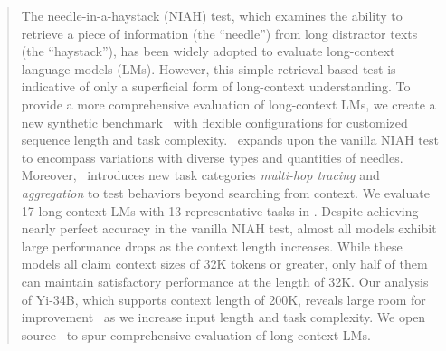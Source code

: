 \begin{abstract}
The needle-in-a-haystack (NIAH) test, which examines the ability to retrieve a piece of information (the ``needle'') from long distractor texts (the ``haystack''), has been widely adopted to evaluate long-context language models (LMs). However, this simple retrieval-based test is indicative of only a superficial form of long-context understanding. To provide a more comprehensive evaluation of long-context LMs, we create a new synthetic benchmark ~with flexible configurations for customized sequence length and task complexity. ~expands upon the vanilla NIAH test to encompass variations with diverse types and quantities of needles. Moreover, ~introduces new task categories \emph{multi-hop tracing} and \emph{aggregation} to test behaviors beyond searching from context. We evaluate 17 long-context LMs with 13 representative tasks in . Despite achieving nearly perfect accuracy in the vanilla NIAH test, almost all models exhibit large performance drops as the context length increases. While these models all claim context sizes of 32K tokens or greater, only half of them can maintain satisfactory performance at the length of 32K.  Our analysis of Yi-34B, which supports context length of 200K, reveals large room for improvement ~as we increase input length and task complexity.  We open source ~to spur comprehensive evaluation of long-context LMs.  
\end{abstract}

